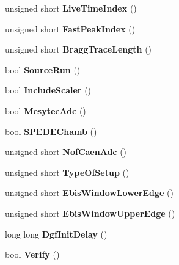 \begin{DoxyCompactItemize}
unsigned short {\bfseries Live\+Time\+Index} ()
\item 
\mbox{\label{class_global_settings_a3045c1e47cf31b2a1f2cdd036d2983d1}} 
unsigned short {\bfseries Fast\+Peak\+Index} ()
\item 
\mbox{\label{class_global_settings_a736690f2a63bcdb18f04f9831a484240}} 
unsigned short {\bfseries Bragg\+Trace\+Length} ()
\item 
\mbox{\label{class_global_settings_a111d8b0e788e3709b00702f3a7ae2728}} 
bool {\bfseries Source\+Run} ()
\item 
\mbox{\label{class_global_settings_a49c569d0d122bff3736e8e3debbfd013}} 
bool {\bfseries Include\+Scaler} ()
\item 
\mbox{\label{class_global_settings_acfaa849a405a80e912b1c42c7b0c258c}} 
bool {\bfseries Mesytec\+Adc} ()
\item 
\mbox{\label{class_global_settings_a4a48a1c192b77998f1b1111d73aeaf5a}} 
bool {\bfseries S\+P\+E\+D\+E\+Chamb} ()
\item 
\mbox{\label{class_global_settings_a0451be00dc54ba72b862ba682399e5e2}} 
unsigned short {\bfseries Nof\+Caen\+Adc} ()
\item 
\mbox{\label{class_global_settings_a5fd349a287cbe0159fb24d4ae2264fbb}} 
unsigned short {\bfseries Type\+Of\+Setup} ()
\item 
\mbox{\label{class_global_settings_ae3067cec604f4bf7692c2a635411ffa3}} 
unsigned short {\bfseries Ebis\+Window\+Lower\+Edge} ()
\item 
\mbox{\label{class_global_settings_ad13bfa3edd5436f4096e52d742348da7}} 
unsigned short {\bfseries Ebis\+Window\+Upper\+Edge} ()
\item 
\mbox{\label{class_global_settings_a2b7b49aa025fef97a5c5bf50f7b181c7}} 
long long {\bfseries Dgf\+Init\+Delay} ()
\item 
\mbox{\label{class_global_settings_a7057529627ce885278a417a6b31634fd}} 
bool {\bfseries Verify} ()
\end{DoxyCompactItemize}

